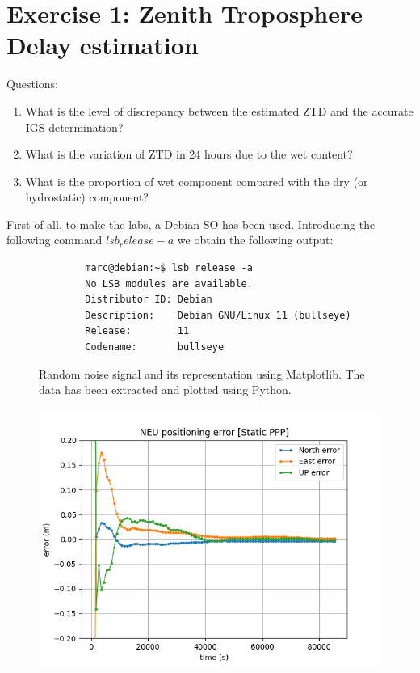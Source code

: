\section{Exercise 1: Zenith Troposphere Delay estimation}


Questions:
\begin{enumerate}
\item What is the level of discrepancy between the estimated ZTD and the accurate IGS determination?
\item What is the variation of ZTD in 24 hours due to the wet content?
\item What is the proportion of wet component compared with the dry (or hydrostatic) component?
\end{enumerate}


First of all, to make the labs, a Debian SO has been used. Introducing the following command $lsb_release -a$ we obtain the following output:\\


\begin{figure}[h]
    \centering
    \begin{verbatim}
        marc@debian:~$ lsb_release -a
        No LSB modules are available.
        Distributor ID: Debian
        Description:    Debian GNU/Linux 11 (bullseye)
        Release:        11
        Codename:       bullseye
    \end{verbatim}
    \caption{Random noise signal and its representation using Matplotlib. The data has been extracted and plotted using Python.
    }
    \label{fig:Ejemplo de código de bash}
\end{figure}


\begin{figure}[H]
        \centering
        \includegraphics[scale=0.52]{sources/Figures/FIG_2/TUT2_Ex1a.png}
        \caption{}
        \label{fig:}
\end{figure}



